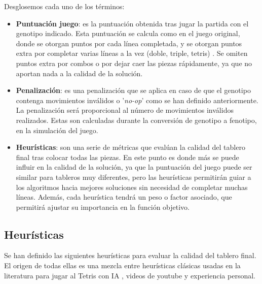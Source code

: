 \documentclass[11pt,spanish,listoffigures,listoftables]{tfgetsinf}
\begin{document}
Desglosemos cada uno de los términos:
\begin{itemize}
    \item \textbf{Puntuación juego}: es la puntuación obtenida tras jugar la partida con el genotipo indicado. Esta puntuación se calcula como en el juego original, donde se otorgan puntos por cada línea completada, y se otorgan puntos extra por completar varias líneas a la vez (doble, triple, tetris) \cite{}. Se omiten puntos extra por combos o por dejar caer las piezas rápidamente, ya que no aportan nada a la calidad de la solución.
    
    \item \textbf{Penalización}: es una penalización que se aplica en caso de que el genotipo contenga movimientos inválidos o '\textit{no-op}' como se han definido anteriormente. La penalización será proporcional al número de movimientos inválidos realizados. Estas son calculadas durante la conversión de genotipo a fenotipo, en la simulación del juego.
    
    \item \textbf{Heurísticas}: son una serie de métricas que evalúan la calidad del tablero final tras colocar todas las piezas. En este punto es donde más se puede influir en la calidad de la solución, ya que la puntuación del juego puede ser similar para tableros muy diferentes, pero las heurísticas permitirán guiar a los algoritmos hacia mejores soluciones sin necesidad de completar muchas líneas. Además, cada heurística tendrá un peso o factor asociado, que permitirá ajustar su importancia en la función objetivo. 
\end{itemize}

\subsection{Heurísticas}
Se han definido las siguientes heurísticas para evaluar la calidad del tablero final. El origen de todas ellas es una mezcla entre heurísticas clásicas usadas en la literatura para jugar al Tetris con IA \cite{}, videos de youtube \cite{} y experiencia personal.
\end{document}
